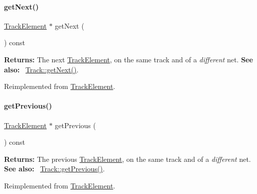 \paragraph{\texorpdfstring{get\+Next()}{getNext()}}
{\footnotesize\ttfamily \hyperlink{classKite_1_1TrackElement}{Track\+Element} $\ast$ get\+Next (\begin{DoxyParamCaption}{ }\end{DoxyParamCaption}) const\hspace{0.3cm}{\ttfamily [virtual]}}

{\bfseries Returns\+:} The next \hyperlink{classKite_1_1TrackElement}{Track\+Element}, on the same track and of a {\itshape different} net. {\bfseries See also\+:}~ \hyperlink{classKite_1_1Track_af3db59591bef3c690ace92c114a4e4aa}{Track\+::get\+Next()}. 

Reimplemented from \hyperlink{classKite_1_1TrackElement_a010b7fc8801c5b88aefa4137cf85186d}{Track\+Element}.

\mbox{\label{classKite_1_1TrackFixedSegment_a55d6115d84c11ad147f4c38fe372ea24}} 
\paragraph{\texorpdfstring{get\+Previous()}{getPrevious()}}
{\footnotesize\ttfamily \hyperlink{classKite_1_1TrackElement}{Track\+Element} $\ast$ get\+Previous (\begin{DoxyParamCaption}{ }\end{DoxyParamCaption}) const\hspace{0.3cm}{\ttfamily [virtual]}}

{\bfseries Returns\+:} The previous \hyperlink{classKite_1_1TrackElement}{Track\+Element}, on the same track and of a {\itshape different} net. {\bfseries See also\+:}~ \hyperlink{classKite_1_1Track_a290fcfe6131730d216951a3b5207d777}{Track\+::get\+Previous()}. 

Reimplemented from \hyperlink{classKite_1_1TrackElement_a55d6115d84c11ad147f4c38fe372ea24}{Track\+Element}.

\mbox{\label{classKite_1_1TrackFixedSegment_ab5b5aaa5b318369feee6003dbad039c2}} 
